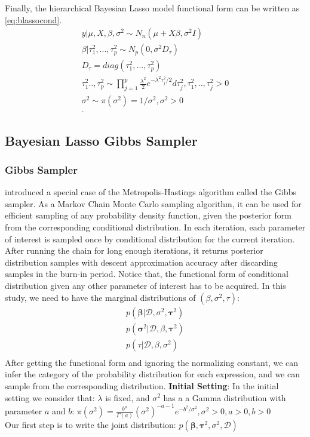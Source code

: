 Finally, the hierarchical Bayesian Lasso model functional form can be written as \autoref{eq:blassocond}.
\begin{equation}
	\label{eq:blassocond}
	\begin{multlined}
		y|\mu,X,\beta,\sigma^2 \sim N_n(\mu + X\beta,\sigma^2I)\\
		\beta|\tau_1^2,...,\tau_p^2 \sim N_p(0,\sigma^2D_{\tau})\\
		D_{\tau} = diag(\tau_1^2,...,\tau_p^2)\\
		\tau_1^2..,\tau_p^2 \sim \prod_{j=1}^p \frac{\lambda^2}{2} e^{-\lambda^2\tau_j^2/2}d\tau_j^2, \tau_1^2,..,\tau_j^2 > 0\\
		\sigma^2 \sim \pi(\sigma^2) = 1/\sigma^2, \sigma^2 > 0\\.
	\end{multlined}
\end{equation}

\subsection{Bayesian Lasso Gibbs Sampler}
\subsubsection{Gibbs Sampler}
\cite{4767596} introduced a special case of the Metropolis-Hastings algorithm called the Gibbs sampler. As a Markov Chain Monte Carlo sampling algorithm, it can be used for efficient sampling of any probability density function, given the posterior form from the corresponding conditional distribution. In each iteration, each parameter of interest is sampled once by conditional distribution for the current iteration. After running the chain for long enough iterations, it returns posterior distribution samples with descent approximation accuracy after discarding samples in the burn-in period. Notice that, the functional form of conditional distribution given any other parameter of interest has to be acquired. In this study, we need to have the marginal distributions of  $(\beta,\sigma^2,\tau)$:
$$
\begin{multlined}
	p(\mathbf{\beta}|\mathcal{D},\sigma^2,\mathbf{\tau}^2)\\
	p(\mathbf{\sigma}^2|\mathcal{D},\beta,\mathbf{\tau}^2)\\
	p(\tau|\mathcal{D},\beta,\sigma^2)\\
\end{multlined}
$$
After getting the functional form and ignoring the normalizing constant, we can infer the category of the probability distribution for each expression, and we can sample from the corresponding distribution.
\textbf{Initial Setting}:
In the initial setting we consider that: $\lambda$ is fixed, and $\sigma^2$ has a a Gamma distribution with parameter $a$ and $b$: $\pi(\sigma^2) = \frac{b^a}{\Gamma(a)} (\sigma^2)^{-a-1}e^{-b^2/\sigma^2},\sigma^2>0,a>0,b>0$ \\
Our first step is to write the joint distribution: $p(\mathbf{\beta},\mathbf{\tau}^2,\sigma^{2},\mathcal{D})$

